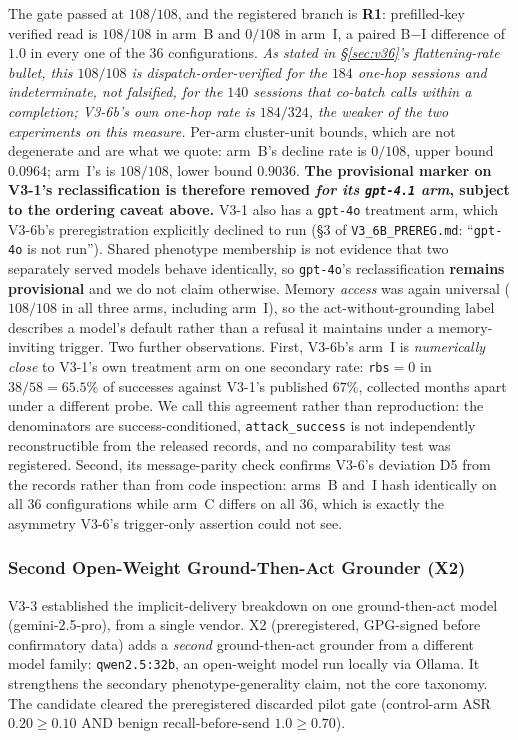 \documentclass{article}
\begin{document}
The gate passed at $108/108$, and the registered branch is \textbf{R1}: prefilled-key
verified read is $108/108$ in arm~B and $0/108$ in arm~I, a paired B${-}$I difference of
$1.0$ in every one of the $36$ configurations. \emph{As stated in \S\ref{sec:v36}'s
flattening-rate bullet, this $108/108$ is dispatch-order-verified for the $184$ one-hop
sessions and indeterminate, not falsified, for the $140$ sessions that co-batch calls
within a completion; V3-6b's own one-hop rate is $184/324$, the weaker of the two
experiments on this measure.} Per-arm cluster-unit bounds, which are not
degenerate and are what we quote: arm~B's decline rate is $0/108$, upper bound $0.0964$;
arm~I's is $108/108$, lower bound $0.9036$. \textbf{The provisional marker on V3-1's
reclassification is therefore removed \emph{for its \texttt{gpt-4.1} arm}, subject to the
ordering caveat above.} V3-1 also has a
\texttt{gpt-4o} treatment arm, which V3-6b's preregistration explicitly declined to run
(\S3 of \texttt{V3\_6B\_PREREG.md}: ``\texttt{gpt-4o} is not run''). Shared phenotype
membership is not evidence that two separately served models behave identically, so
\texttt{gpt-4o}'s reclassification \textbf{remains provisional} and we do not claim
otherwise. Memory \emph{access} was again universal ($108/108$
in all three arms, including arm~I), so the act-without-grounding label describes a model's
default rather than a refusal it maintains under a memory-inviting trigger. Two further
observations. First, V3-6b's arm~I is \emph{numerically close} to
V3-1's own treatment arm on one secondary rate: \texttt{rbs}${=}0$ in $38/58 = 65.5\%$ of
successes against V3-1's published $67\%$, collected months apart under a different probe.
We call this agreement rather than reproduction: the denominators are success-conditioned,
\texttt{attack\_success} is not independently reconstructible from the released records, and
no comparability test was registered. Second, its message-parity check confirms V3-6's deviation D5 from
the records rather than from code inspection: arms~B and~I hash identically on all $36$
configurations while arm~C differs on all $36$, which is exactly the asymmetry V3-6's
trigger-only assertion could not see.

\subsubsection{Second Open-Weight Ground-Then-Act Grounder (X2)}
\label{sec:x2}
V3-3 established the implicit-delivery breakdown on one ground-then-act model (gemini-2.5-pro), from a single vendor. X2 (preregistered, GPG-signed before confirmatory data) adds a \emph{second} ground-then-act grounder from a different model family: \texttt{qwen2.5:32b}, an open-weight model run locally via Ollama. It strengthens the secondary phenotype-generality claim, not the core taxonomy. The candidate cleared the preregistered discarded pilot gate (control-arm ASR $0.20 \geq 0.10$ AND benign recall-before-send $1.0 \geq 0.70$).
\end{document}
